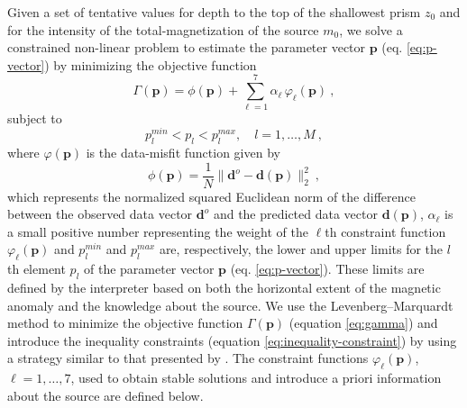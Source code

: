 Given a set of tentative values for depth to the top of the shallowest prism $z_{0}$ and for the intensity of the total-magnetization of the source
$m_{0}$, we solve a constrained non-linear problem to estimate the parameter vector $\mathbf{p}$ (eq. \ref{eq:p-vector}) by minimizing the 
objective function
\begin{equation}
\Gamma (\mathbf{p}) = \phi (\mathbf{p}) + \sum\limits^{7}_{\ell =1} \alpha_{\ell} \, \varphi_{\ell}(\mathbf{p}) \: ,
\label{eq:gamma}
\end{equation}
subject to
\begin{equation}
p_{l}^{min} < p_{l} < p_{l}^{max}, \quad l = 1, \dots, M \: ,
\label{eq:inequality-constraint}
\end{equation}
where $\varphi (\mathbf{p})$ is the data-misfit function given by
\begin{equation}\label{eq:misfit}
\phi (\mathbf{p}) = \frac{1}{N} \| \mathbf{d}^{o} - \mathbf{d}(\mathbf{p}) \|_{2}^{2} \: ,
\end{equation}
which represents the normalized squared Euclidean norm of the difference between the observed data vector $\mathbf{d}^{o}$ and 
the predicted data vector $\mathbf{d}(\mathbf{p})$, $\alpha_{\ell}$ is a small positive number representing the weight of the 
$\ell$th constraint function $\varphi_{\ell}(\mathbf{p})$ and $p_{l}^{min}$ and $p_{l}^{max}$ are, respectively, the lower and 
upper limits for the $l$th element $p_{l}$ of the parameter vector $\mathbf{p}$ (eq. \ref{eq:p-vector}). 
These limits are defined by the interpreter based on both the horizontal extent of the magnetic anomaly and the knowledge 
about the source.
We use the Levenberg–Marquardt method \citep[][ p. 240]{aster-etal2019} to minimize the objective function 
$\Gamma (\mathbf{p})$ (equation \ref{eq:gamma}) and introduce the inequality constraints 
(equation \ref{eq:inequality-constraint}) by using a strategy similar to that presented by \citet{barbosa-etal1999}.
The constraint functions $\varphi_{\ell}(\mathbf{p})$, $\ell = 1, \dots , 7$, used to obtain stable solutions and 
introduce a priori information about the source are defined below.

